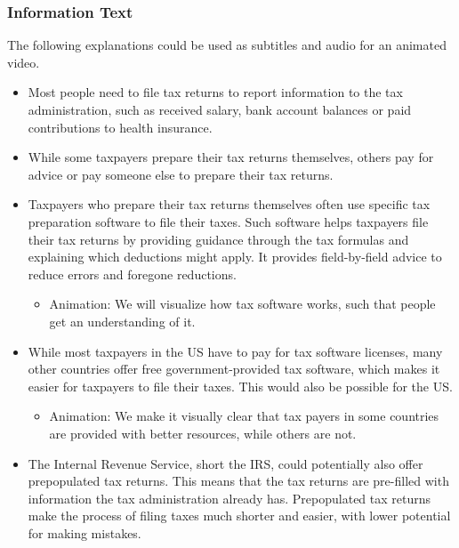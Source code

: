\documentclass[11pt]{article}
\begin{document}
\subsubsection*{Information Text}
The following explanations could be used as subtitles and audio for an animated video.
\begin{itemize}
    \item Most people need to file tax returns to report information to the tax administration, such as received salary, bank account balances or paid contributions to health insurance.
    \item While some taxpayers prepare their tax returns themselves, others pay for advice or pay someone else to prepare their tax returns. 
    \item Taxpayers who prepare their tax returns themselves often use specific tax preparation software to file their taxes. Such software helps taxpayers file their tax returns by providing guidance through the tax formulas and explaining which deductions might apply. It provides field-by-field advice to reduce errors and foregone reductions.
    \begin{itemize}
        \item Animation: We will visualize how tax software works, such that people get an understanding of it. 
    \end{itemize}
    \item While most taxpayers in the US have to pay for tax software licenses, many other countries offer free government-provided tax software, which makes it easier for taxpayers to file their taxes. This would also be possible for the US. 
    \begin{itemize}
        \item Animation: We make it visually clear that tax payers in some countries are provided with better resources, while others are not. 
    \end{itemize}
    \item The Internal Revenue Service, short the IRS, could potentially also offer prepopulated tax returns. This means that the tax returns are pre-filled with information the tax administration already has. Prepopulated tax returns make the process of filing taxes much shorter and easier, with lower potential for making mistakes.

\end{itemize}
\end{document}
